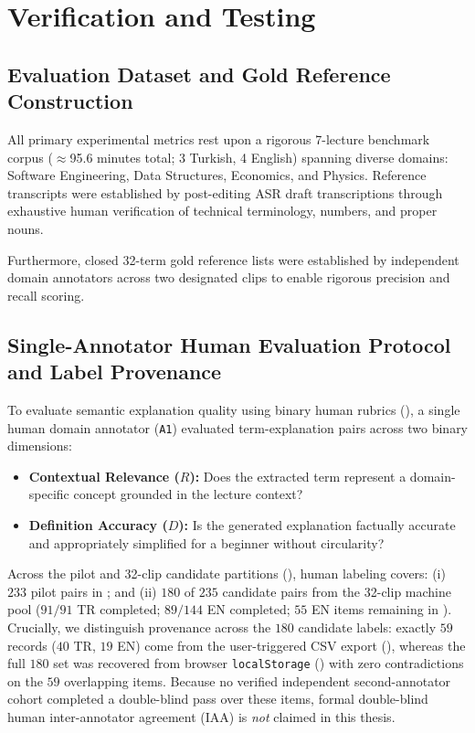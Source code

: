 \documentclass[a4paper,12pt]{report}
\begin{document}
\section{Verification and Testing}

\subsection{Evaluation Dataset and Gold Reference Construction}
All primary experimental metrics rest upon a rigorous 7-lecture benchmark corpus ($\approx$95.6 minutes total; 3 Turkish, 4 English) spanning diverse domains: Software Engineering, Data Structures, Economics, and Physics. Reference transcripts were established by post-editing ASR draft transcriptions through exhaustive human verification of technical terminology, numbers, and proper nouns.

Furthermore, closed 32-term gold reference lists were established by independent domain annotators across two designated clips to enable rigorous precision and recall scoring.

\subsection{Single-Annotator Human Evaluation Protocol and Label Provenance}
To evaluate semantic explanation quality using binary human rubrics (), a single human domain annotator (\texttt{A1}) evaluated term-explanation pairs across two binary dimensions:
\begin{itemize}
    \item \textbf{Contextual Relevance ($R$):} Does the extracted term represent a domain-specific concept grounded in the lecture context?
    \item \textbf{Definition Accuracy ($D$):} Is the generated explanation factually accurate and appropriately simplified for a beginner without circularity?
\end{itemize}

Across the pilot and 32-clip candidate partitions (), human labeling covers: (i) $233$ pilot pairs in ; and (ii) $180$ of $235$ candidate pairs from the 32-clip machine pool ($91/91$ TR completed; $89/144$ EN completed; $55$ EN items remaining in ). Crucially, we distinguish provenance across the $180$ candidate labels: exactly $59$ records ($40$ TR, $19$ EN) come from the user-triggered CSV export (), whereas the full $180$ set was recovered from browser \texttt{localStorage} () with zero contradictions on the $59$ overlapping items. Because no verified independent second-annotator cohort completed a double-blind pass over these items, formal double-blind human inter-annotator agreement (IAA) is \emph{not} claimed in this thesis.
\end{document}
